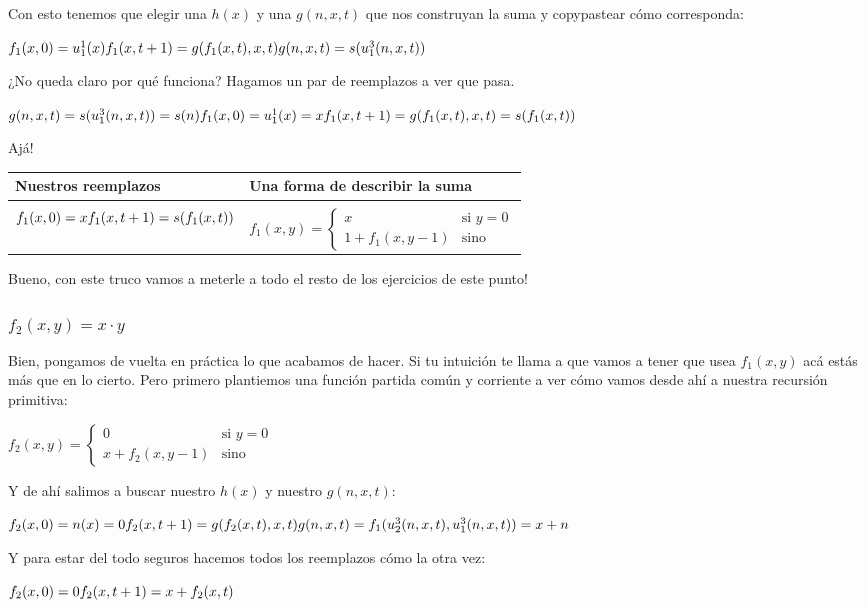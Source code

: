 \documentclass[11pt]{article} %
\newlength{\desarrollolen}
\newcommand{\desarrollo}[2][3em]{

    \hspace{2em}
    \addtolength{\desarrollolen}{-#1}
    \begin{minipage}{\desarrollolen}
        #2
    \end{minipage}
    \addtolength{\desarrollolen}{#1}

}
\begin{document}
Con esto tenemos que elegir una $h(x)$ y una $g(n,x,t)$ que nos construyan la suma y copypastear cómo corresponda:
\desarrollo{$
f_1(x,0)   = u^1_1(x) \\
f_1(x,t+1) = g(f_1(x,t),x,t) \\
g(n,x,t)   = s(u^3_1(n,x,t))
$}

¿No queda claro por qué funciona? Hagamos un par de reemplazos a ver que pasa.
\desarrollo{$
g(n,x,t)   = s(u^3_1(n,x,t)) = s(n) \\
f_1(x,0)   = u^1_1(x) = x \\
f_1(x,t+1) = g(f_1(x,t),x,t) = s(f_1(x,t))
$}

Ajá!
\desarrollo{
\begin{tabular}{m{5cm}|l}
Nuestros reemplazos & Una forma de describir la suma \\ \hline \\[-7pt]
$
f_1(x,0)   = x \newline
f_1(x,t+1) = s(f_1(x,t))
$ & $
f_1(x,y) = 
\begin{cases}
  x             & \text{si } y = 0 \\
  1 + f_1(x, y-1) & \text{sino}
\end{cases}
$
\end{tabular}
}

Bueno, con este truco vamos a meterle a todo el resto de los ejercicios de este punto!

\subsubsection{$f_2(x,y)=x \cdot y$}

Bien, pongamos de vuelta en práctica lo que acabamos de hacer. Si tu intuición te llama a que vamos a tener que usea $f_1(x,y)$ acá estás más que en lo cierto. Pero primero plantiemos una función partida común y corriente a ver cómo vamos desde ahí a nuestra recursión primitiva:
\desarrollo{$
f_2(x,y) = 
\begin{cases}
  0             & \text{si } y = 0 \\
  x + f_2(x, y-1) & \text{sino}
\end{cases}
$}

Y de ahí salimos a buscar nuestro $h(x)$ y nuestro $g(n,x,t)$:
\desarrollo{$
f_2(x,0)   = n(x) = 0 \\
f_2(x,t+1) = g(f_2(x,t),x,t) \\
g(n,x,t)   = f_1(u^3_2(n,x,t),u^3_1(n,x,t)) = x + n
$}

Y para estar del todo seguros hacemos todos los reemplazos cómo la otra vez:
\desarrollo{$
f_2(x,0)   = 0\\
f_2(x,t+1) = x + f_2(x,t)
$}
\end{document}
